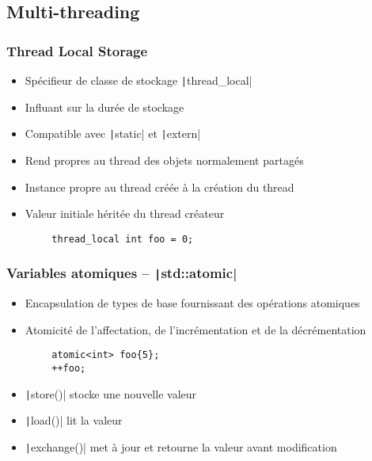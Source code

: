 \documentclass[C++.tex]{subfiles}
\begin{document}
\subsection*{Multi-threading}
\begin{frame}[fragile]
	\frametitle{Thread Local Storage}
	\begin{itemize}
		\item Spécifieur de classe de stockage \texttt|thread_local|
		\item Influant sur la durée de stockage
		\item Compatible avec \texttt|static| et \texttt|extern|
		\item Rend propres au thread des objets normalement partagés


		\item Instance propre au thread créée à la création du thread
		\item Valeur initiale héritée du thread créateur
	\end{itemize}

	\begin{verbatim}
		thread_local int foo = 0;
	\end{verbatim}
\end{frame}

\begin{frame}[fragile]
	\frametitle{Variables atomiques -- \texttt|std::atomic|}
	\begin{itemize}
		\item Encapsulation de types de base fournissant des opérations atomiques
		\item Atomicité de l'affectation, de l'incrémentation et de la décrémentation
	\end{itemize}

	\begin{verbatim}
		atomic<int> foo{5};
		++foo; 
	\end{verbatim}

	\begin{itemize}
		\item \texttt|store()| stocke une nouvelle valeur
		\item \texttt|load()| lit la valeur
		\item \texttt|exchange()| met à jour et retourne la valeur avant modification
	\end{itemize}
\end{frame}
\end{document}
